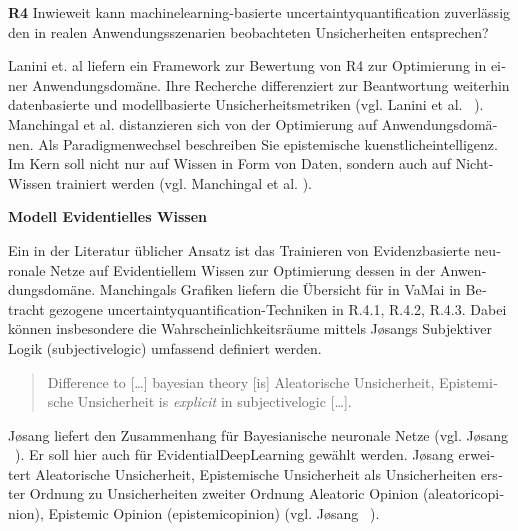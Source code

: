\begin{otherlanguage}{ngerman}
\textbf{R4} Inwieweit kann \gls{machinelearning}-basierte \gls{uncertaintyquantification} zuverlässig den in realen Anwendungsszenarien beobachteten Unsicherheiten entsprechen?
\par\vspace{1\baselineskip}\noindent


Lanini et. al liefern ein Framework zur Bewertung von R4 zur Optimierung in einer Anwendungsdomäne. Ihre Recherche differenziert zur Beantwortung weiterhin datenbasierte und modellbasierte Unsicherheitsmetriken (vgl. Lanini et al. ~\parencite{Lanini2024}). 
\newline
Manchingal et al. distanzieren sich von der Optimierung auf Anwendungsdomänen. Als Paradigmenwechsel beschreiben Sie epistemische \gls{kuenstlicheintelligenz}. Im Kern soll nicht nur auf Wissen in Form von Daten, sondern auch auf Nicht-Wissen trainiert werden (vgl. Manchingal et al. \parencite{manchingal2025}). 


\pagebreak


\textbf{Modell Evidentielles Wissen}

Ein in der Literatur üblicher Ansatz ist das Trainieren von \gls{Evidenzbasierte neuronale Netze} auf Evidentiellem Wissen zur Optimierung dessen in der Anwendungsdomäne. Manchingals Grafiken liefern die Übersicht für in VaMai in Betracht gezogene \gls{uncertaintyquantification}-Techniken in R.4.1, R.4.2, R.4.3. Dabei können insbesondere die Wahrscheinlichkeitsräume mittels Jøsangs Subjektiver Logik (\gls{subjectivelogic}) umfassend definiert werden. 

\begin{quote}
  \glqq{}Difference to [\dots] bayesian theory [is] \gls{Aleatorische Unsicherheit}, \gls{Epistemische Unsicherheit} is \textit{explicit} in \gls{subjectivelogic} [\dots].\grqq{}\par\vspace{0\baselineskip}\noindent
  \parencite[{vgl. J\o{}sang S. 42, Z.38 ff.}]{josang2016subjective}
\end{quote}

J\o{}sang liefert den Zusammenhang für \gls{Bayesianische neuronale Netze} (vgl. J\o{}sang ~\parencite[vgl. S.42]{josang2016subjective}). Er soll hier auch für \gls{EvidentialDeepLearning} gewählt werden. J\o{}sang erweitert \gls{Aleatorische Unsicherheit}, \gls{Epistemische Unsicherheit} als Unsicherheiten erster Ordnung zu Unsicherheiten zweiter Ordnung \glqq Aleatoric Opinion \grqq (\gls{aleatoricopinion}), \glqq Epistemic Opinion \grqq (\gls{epistemicopinion}) (vgl. J\o{}sang ~\parencite[{S.22, Z.10-16; S.22 Z. 17-26; S.23, Z. 5-; S.23 Z.9-12}]{josang2016subjective}). \par\vspace{1\baselineskip}\noindent


\end{otherlanguage}
